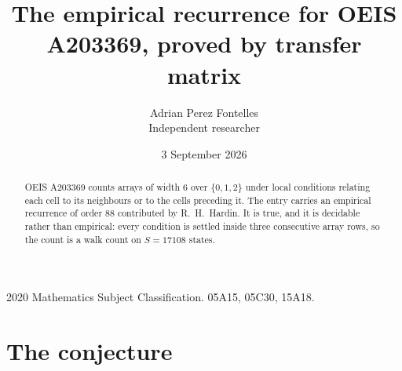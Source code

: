 \documentclass[11pt,a4paper]{article}
\title{The empirical recurrence for OEIS A203369, proved by transfer matrix}
\author{Adrian Perez Fontelles\\ \small Independent researcher}
\date{3 September 2026}
\theoremstyle{plain}
\theoremstyle{definition}
\begin{document}
\maketitle

\begin{abstract}
OEIS A203369 counts arrays of width $6$ over $\{0,1,2\}$ under local conditions relating each cell
to its neighbours or to the cells preceding it. The entry carries an empirical recurrence of
order $88$ contributed by R.~H.~Hardin. It is true, and it is decidable rather than
empirical: every condition is settled inside three consecutive array rows, so the count is a
walk count on $S=17108$ states.
\end{abstract}

\noindent\small 2020 Mathematics Subject Classification. 05A15, 05C30, 15A18.\normalsize

\section{The conjecture}
\end{document}
